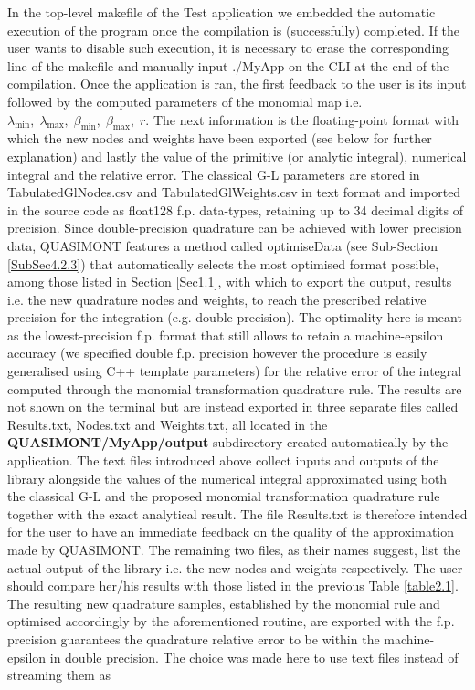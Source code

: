 \documentclass[a4paper, twosided]{book}
\begin{document}
\noindent
In the top-level \colorbox{poliGrayBlue}{makefile} of the \colorbox{poliGrayBlue}{Test} application we embedded the automatic execution of the program once the compilation is (successfully) completed. If the user wants to disable such execution, it is necessary to erase the corresponding line of the \colorbox{poliGrayBlue}{makefile} and manually input \colorbox{poliGrayBlue}{./MyApp} on the CLI at the end of the compilation. Once the application is ran, the first feedback to the user is its input followed by the computed parameters of the monomial map i.e. $\lambda_{\text{min}},\;\lambda_{\text{max}},\;\beta_{\text{min}},\;\beta_{\text{max}},\;r$. The next information is the floating-point format with which the new nodes and weights have been exported (see below for further explanation) and lastly the value of the primitive (or analytic integral), numerical integral and the relative error. The classical G-L parameters are stored in \colorbox{poliGrayBlue}{TabulatedGlNodes.csv} and \colorbox{poliGrayBlue}{TabulatedGlWeights.csv} in text format and imported in the source code as \colorbox{poliGrayBlue}{float128} f.p. data-types, retaining up to 34 decimal digits of precision. Since double-precision quadrature can be achieved with lower precision data, QUASIMONT features a method called \colorbox{poliGrayBlue}{optimiseData} (see Sub-Section \ref{SubSec4.2.3}) that automatically selects the most optimised format possible, among those listed in Section \ref{Sec1.1}, with which to export the output, results i.e. the new quadrature nodes and weights, to reach the prescribed relative precision for the integration (e.g. double precision). The optimality here is meant as the lowest-precision f.p. format that still allows to retain a machine-epsilon accuracy (we specified double f.p. precision however the procedure is easily generalised using C++ template parameters) for the relative error of the integral computed through the monomial  transformation quadrature rule. The results are not shown on the terminal but are instead exported in three separate files called \colorbox{poliGrayBlue}{Results.txt}, \colorbox{poliGrayBlue}{Nodes.txt} and \colorbox{poliGrayBlue}{Weights.txt}, all located in the \colorbox{poliGrayBlue}{\textbf{QUASIMONT/MyApp/output}} subdirectory created automatically by the application. The text files introduced above collect inputs and outputs of the library alongside the values of the numerical integral approximated using both the classical G-L and the proposed monomial transformation quadrature rule together with the exact analytical result. The file \colorbox{poliGrayBlue}{Results.txt} is therefore intended for the user to have an immediate feedback on the quality of the approximation made by QUASIMONT. The remaining two files, as their names suggest, list the actual output of the library i.e. the new nodes and weights respectively. The user should compare her/his results with those listed in the previous Table \ref{table2.1}. The resulting new quadrature samples, established by the monomial rule and optimised accordingly by the aforementioned routine, are exported with the f.p. precision guarantees the quadrature relative error to be within the machine-epsilon in double precision. The choice was made here to use text files instead of streaming them as 
\end{document}
